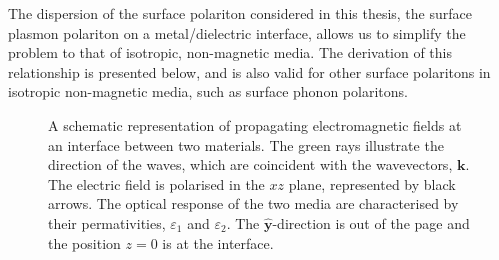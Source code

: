 The dispersion of the surface polariton considered in this thesis, the surface plasmon polariton on a metal/dielectric interface, allows us to simplify the problem to that of isotropic, non-magnetic media. The derivation of this relationship \cite{Raether1988} is presented below, and is also valid for other surface polaritons in isotropic non-magnetic media, such as surface phonon polaritons.

\begin{figure}[h]
\begin{center}

\end{center}
\caption[A schematic representation of propagating electromagnetic fields at an interface between two materials.]{\label{fig:planar-coords}A schematic representation of propagating electromagnetic fields at an interface between two materials. The green rays illustrate the direction of the waves, which are coincident with the wavevectors, \color{green}$\mathbf{k}$\color{black}. The electric field is polarised in the $xz$ plane, represented by black arrows. The optical response of the two media are characterised by their permativities, $\varepsilon_1$ and $\varepsilon_2$. The $\mathbf{\hat{y}}$-direction is out of the page and the position $z=0$ is at the interface. }
\end{figure}

